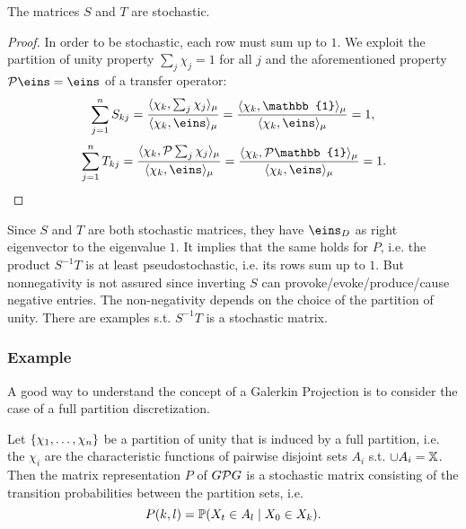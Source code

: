 \begin{thm}
The matrices $S$ and $T$ are stochastic. 
\end{thm}
\begin{proof}
In order to be stochastic, each row must sum up to $1$. We exploit the partition of unity property $\sum_j \chi_j = 1$ for all $j$ and the aforementioned property $\Pcal  \eins =  \eins$ of a transfer operator:
\begin{equation*}
\sum_{j=1}^n S_{kj}
= \frac{\langle \chi_k, \sum_j\chi_j \rangle_\mu}{\langle \chi_k, \eins \rangle_\mu}
= \frac{\langle \chi_k, \mathbb{1} \rangle_\mu}{\langle \chi_k, \eins \rangle_\mu} =1,
\end{equation*}
\begin{equation*}
\sum_{j=1}^n T_{kj}
= \frac{\langle \chi_k, \Pcal \sum_j \chi_j \rangle_\mu}{\langle \chi_k, \eins \rangle_\mu}
= \frac{\langle \chi_k, \Pcal \mathbb{1} \rangle_\mu}{\langle \chi_k, \eins \rangle_\mu} = 1.
\end{equation*}
\end{proof}
Since $S$ and $T$ are both stochastic matrices, they have $\eins_D$ as right eigenvector to the eigenvalue $1$. It implies that the same holds for $P$, i.e.
the product $S^{-1}T$ is at least pseudostochastic, i.e. its rows sum up to $1$. But nonnegativity is not assured since inverting $S$ can provoke/evoke/produce/cause negative entries. The non-negativity depends on the choice of the partition of unity. There are examples s.t. $S^{-1}T$ is a stochastic matrix.

\subsubsection*{Example}

A good way to understand the concept of a Galerkin Projection is to consider the case of a full partition discretization.

\begin{thm}
Let $\{ \chi_1,\dots,\chi_n \}$ be a partition of unity that is induced by a full partition, i.e. the $\chi_i$ are the characteristic functions of pairwise disjoint sets $A_i$ s.t. $\cup A_i = \mathbb{X}$. Then the matrix representation $P$ of $G\mathcal{P} G$ is a stochastic matrix consisting of the transition probabilities between the partition sets, i.e.
\begin{equation*}
P(k,l) = \mathbb{P}(X_t \in A_l \mid X_0 \in X_k).
\end{equation*}
\end{thm}


